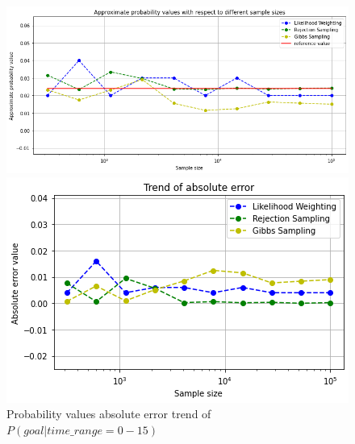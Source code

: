 \documentclass[a4paper,10pt]{report}
\begin{document}
\begin{figure}[h]
  \centering\begin{minipage}[b]{0.45\textwidth}
    \includegraphics[width=\textwidth]{assets/img/query4prob.png}
  \end{minipage}
  \hfill\begin{minipage}[b]{0.45\textwidth}
    \includegraphics[width=\textwidth]{assets/img/query4error.png}
  \end{minipage}
\caption{Probability values absolute error trend of $P(goal | time\_range = 0-15)$}
\label{fig:query4results}
\end{figure}




\end{document}
